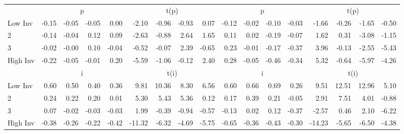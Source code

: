 \begin{table}[!ht]
\begin{tabular}{lrrrrrrrrrrrrrrrr}
  
    
      & \multicolumn{4}{c}{p} & \multicolumn{4}{c}{t(p)}
    
      & \multicolumn{4}{c}{p} & \multicolumn{4}{c}{t(p)}
    
    \\
      \cmidrule(r){2-5} \cmidrule(r){6-9} \cmidrule(r){10-13} \cmidrule(r){14-17}

    Low Inv   & -0.15  & -0.05  & -0.05  & 0.00  & -2.10  & -0.96  & -0.93  & 0.07  & -0.12  & -0.02  & -0.10  & -0.03  & -1.66  & -0.26  & -1.65  & -0.50  \\
           2  & -0.14  & -0.04  & 0.12  & 0.09  & -2.63  & -0.88  & 2.64  & 1.65  & 0.11  & 0.02  & -0.19  & -0.07  & 1.62  & 0.31  & -3.08  & -1.15  \\
           3  & -0.02  & -0.00  & 0.10  & -0.04  & -0.52  & -0.07  & 2.39  & -0.65  & 0.23  & -0.01  & -0.17  & -0.37  & 3.96  & -0.13  & -2.55  & -5.43  \\
    High Inv  & -0.22  & -0.05  & -0.01  & 0.20  & -5.59  & -1.06  & -0.12  & 2.40  & 0.28  & -0.05  & -0.46  & -0.34  & 5.32  & -0.64  & -5.97  & -4.26  \\

  
    
      & \multicolumn{4}{c}{i} & \multicolumn{4}{c}{t(i)}
    
      & \multicolumn{4}{c}{i} & \multicolumn{4}{c}{t(i)}
    
    \\
      \cmidrule(r){2-5} \cmidrule(r){6-9} \cmidrule(r){10-13} \cmidrule(r){14-17}

    Low Inv   & 0.60  & 0.50  & 0.40  & 0.36  & 9.81  & 10.36  & 8.30  & 6.56  & 0.60  & 0.66  & 0.69  & 0.26  & 9.51  & 12.51  & 12.96  & 5.10  \\
           2  & 0.24  & 0.22  & 0.20  & 0.01  & 5.30  & 5.43  & 5.36  & 0.12  & 0.17  & 0.39  & 0.21  & -0.05  & 2.91  & 7.51  & 4.01  & -0.88  \\
           3  & 0.07  & -0.02  & -0.03  & -0.03  & 1.99  & -0.39  & -0.94  & -0.57  & -0.13  & 0.02  & 0.12  & -0.37  & -2.57  & 0.46  & 2.10  & -6.22  \\
    High Inv  & -0.38  & -0.26  & -0.22  & -0.42  & -11.32  & -6.32  & -4.69  & -5.75  & -0.65  & -0.36  & -0.43  & -0.30  & -14.23  & -5.65  & -6.50  & -4.38  \\

  

  \bottomrule
\end{tabular}
\label{tbl:32_Size_BM_Inv_FF2016}
\end{table}